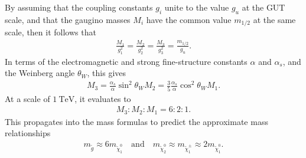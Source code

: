 \documentclass[twoside,english]{uiofysmaster}
\begin{document}
 By assuming that the coupling constants $g_i$ unite to the value $g_u$ at the GUT scale, and that the gaugino masses $M_i$ have the common value $m_{1/2}$ at the same scale, then it follows that
 \begin{align}
 	\frac{M_1}{g_1^2} = \frac{M_2}{g_2^2} = \frac{M_3}{g_3^2} = \frac{m_{1/2}}{g_u}.
 \end{align}
 In terms of the electromagnetic and strong fine-structure constants $\alpha$ and $\alpha_s$, and the Weinberg angle $\theta_W$, this gives
 \begin{align}
 	M_3 = \frac{\alpha_s}{\alpha}\sin^2\theta_W M_2 = \frac{3}{5}\frac{\alpha_s}{\alpha} \cos^2\theta_W M_1.
 \end{align}
 At a scale of $1 ~\mathrm{TeV}$, it evaluates to 
 \begin{align}
 	M_3 : M_2 : M_1 = 6 : 2 : 1.
 \end{align}
 This propagates into the mass formulas to predict the approximate mass relationships
 \begin{align}
 	m_{\tilde g} \approx 6m_{\tilde \chi_1^0} \quad \mathrm{and} \quad m_{\tilde \chi_2^0} \approx m_{\tilde \chi_1^\pm} \approx 2m_{\tilde \chi_1^0}.
 \end{align}
\end{document}
